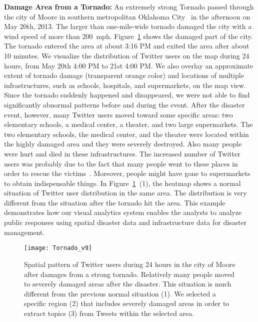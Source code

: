 \textbf{Damage Area from a Tornado:} An extremely strong Tornado passed through the city of Moore in southern metropolitan Oklahoma City~\cite{WKP:2013:MOORE} in the afternoon on May 20th, 2013.
The larger than one-mile-wide tornado damaged the city with a wind speed of more than 200~mph.
Figure~\ref{fig:tornado} shows the damaged part of the city.
The tornado entered the area at about 3:16 PM and exited the area after about 10 minutes.
We visualize the distribution of Twitter users on the map during 24 hours, from May 20th 4:00 PM to 21st 4:00 PM.
We also overlay an approximate extent of tornado damage (transparent orange color) and locations of multiple infrastructures, such as schools, hospitals, and supermarkets, on the map view.
Since the tornado suddenly happened and disappeared, we were not able to find significantly abnormal patterns before and during the event. 
After the disaster event, however, many Twitter users moved toward some specific areas: two elementary schools, a medical center, a theater, and two large supermarkets.
The two elementary schools, the medical center, and the theater were located within the highly damaged area and they were severely destroyed.
Also many people were hurt and died in these infrastructures.
The increased number of Twitter users was probably due to the fact that many people went to these places in order to rescue the victims~\cite{TWITCHY:2013:CHG}.
Moreover, people might have gone to supermarkets to obtain indispensable things.
In Figure~\ref{fig:tornado}~(1), the heatmap shows a normal situation of Twitter user distribution in the same area.
The distribution is very different from the situation after the tornado hit the area.
This example demonstrates how our visual analytics system enables the analysts to analyze public responses using spatial disaster data and infrastructure data for disaster management.

\begin{figure}[tbh]
\centering
\texttt{[image: Tornado\_v9]}
\caption{Spatial pattern of Twitter users during 24 hours in the city of Moore after damages from a strong tornado. Relatively many people moved to severely damaged areas after the disaster. This situation is much different from the previous normal situation (1). We selected a specific region (2) that includes severely damaged areas in order to extract topics (3) from Tweets within the selected area.}
\label{fig:tornado}
\end{figure}

